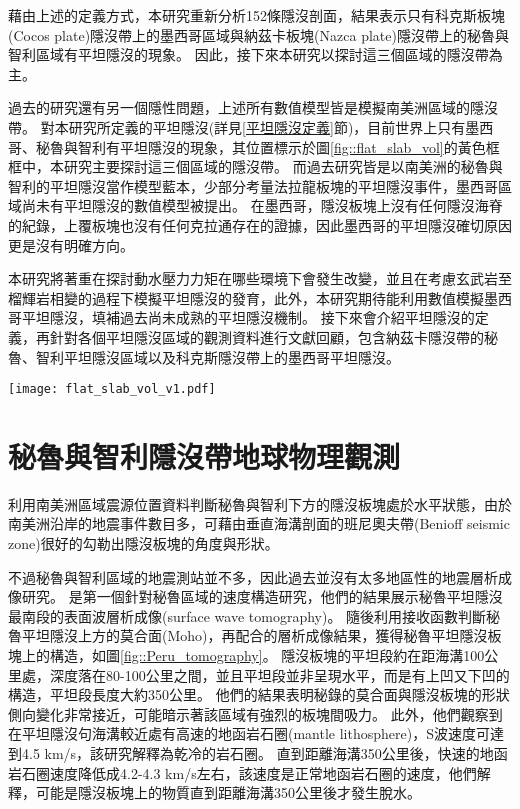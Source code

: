 藉由上述的定義方式，本研究重新分析152條隱沒剖面，結果表示只有科克斯板塊(Cocos plate)隱沒帶上的墨西哥區域與納茲卡板塊(Nazca plate)隱沒帶上的秘魯與智利區域有平坦隱沒的現象。
因此，接下來本研究以探討這三個區域的隱沒帶為主。

過去的研究還有另一個隱性問題，上述所有數值模型皆是模擬南美洲區域的隱沒帶。
對本研究所定義的平坦隱沒(詳見\ref{平坦隱沒定義}節)，目前世界上只有墨西哥、秘魯與智利有平坦隱沒的現象，其位置標示於圖\ref{fig::flat_slab_vol}的黃色框框中，本研究主要探討這三個區域的隱沒帶。
而過去研究皆是以南美洲的秘魯與智利的平坦隱沒當作模型藍本，少部分考量法拉龍板塊的平坦隱沒事件，墨西哥區域尚未有平坦隱沒的數值模型被提出。
在墨西哥，隱沒板塊上沒有任何隱沒海脊的紀錄，上覆板塊也沒有任何克拉通存在的證據，因此墨西哥的平坦隱沒確切原因更是沒有明確方向。

本研究將著重在探討動水壓力力矩在哪些環境下會發生改變，並且在考慮玄武岩至榴輝岩相變的過程下模擬平坦隱沒的發育，此外，本研究期待能利用數值模擬墨西哥平坦隱沒，填補過去尚未成熟的平坦隱沒機制。
接下來會介紹平坦隱沒的定義，再針對各個平坦隱沒區域的觀測資料進行文獻回顧，包含納茲卡隱沒帶的秘魯、智利平坦隱沒區域以及科克斯隱沒帶上的墨西哥平坦隱沒。
\begin{figure*}[ht!]
    \centering
    \texttt{[image: flat\_slab\_vol\_v1.pdf]}
    \caption[研究區域板塊構造圖]{研究區域板塊構造圖，灰色實線為板塊邊界，資料來自\citealp{bird2003updated}，橘紅色三角形為火山分佈，資料來自\citealp{venzke2013global}，黑色虛線為每50公里深之板塊等深度線，其中50、100與150公里等深度線加粗，資料來自\citealp{hayes2018slab2}。黃色框框圈起處為平坦隱沒位置。
    }
    \label{fig::flat_slab_vol}
\end{figure*}

\section{秘魯與智利隱沒帶地球物理觀測}\label{秘魯與智利隱沒帶地球物理觀測}
\citealp{barazangi1976}利用南美洲區域震源位置資料判斷秘魯與智利下方的隱沒板塊處於水平狀態，由於南美洲沿岸的地震事件數目多，可藉由垂直海溝剖面的班尼奧夫帶(Benioff seismic zone)很好的勾勒出隱沒板塊的角度與形狀。

不過秘魯與智利區域的地震測站並不多，因此過去並沒有太多地區性的地震層析成像研究。
\citealp{Ma2014}是第一個針對秘魯區域的速度構造研究，他們的結果展示秘魯平坦隱沒最南段的表面波層析成像(surface wave tomography)。
隨後\citealp{Ma2015}利用接收函數判斷秘魯平坦隱沒上方的莫合面(Moho)，再配合\citealp{Ma2014}的層析成像結果，獲得秘魯平坦隱沒板塊上的構造，如圖\ref{fig::Peru_tomography}。
隱沒板塊的平坦段約在距海溝100公里處，深度落在80-100公里之間，並且平坦段並非呈現水平，而是有上凹又下凹的構造，平坦段長度大約350公里。
他們的結果表明秘錄的莫合面與隱沒板塊的形狀側向變化非常接近，可能暗示著該區域有強烈的板塊間吸力。
此外，他們觀察到在平坦隱沒句海溝較近處有高速的地函岩石圈(mantle lithosphere)，S波速度可達到4.5 km/s，該研究解釋為乾冷的岩石圈。
直到距離海溝350公里後，快速的地函岩石圈速度降低成4.2-4.3 km/s左右，該速度是正常地函岩石圈的速度，他們解釋，可能是隱沒板塊上的物質直到距離海溝350公里後才發生脫水。

